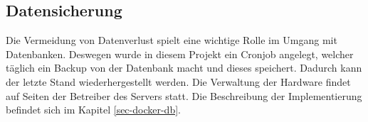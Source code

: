 \subsection{Datensicherung}
Die Vermeidung von Datenverlust spielt eine wichtige Rolle im Umgang mit Datenbanken. Deswegen wurde in diesem
Projekt ein Cronjob angelegt, welcher täglich ein Backup von der Datenbank macht und dieses speichert. Dadurch kann
der letzte Stand wiederhergestellt werden. Die Verwaltung der Hardware findet auf Seiten der Betreiber des Servers statt.
Die Beschreibung der Implementierung befindet sich im Kapitel \ref{sec-docker-db}.